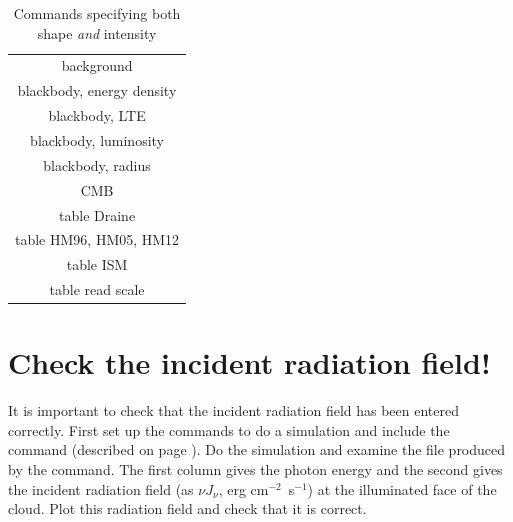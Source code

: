 \begin{center}
\begin{table}
\centering
\caption{\label{tab:ShapeIntensityCommands}
Commands specifying both shape \emph{and} intensity}
\label{table:3}
\begin{tabular}{c}
\hline
background\\
 blackbody, energy density\\
blackbody, LTE\\
blackbody,
luminosity\\
blackbody, radius\\
CMB\\
table Draine\\
table HM96, HM05, HM12\\
table ISM\\
table read scale\\
\hline
\end{tabular}
\end{table}
\end{center}

\section{Check the incident radiation field!}

It is important to check that the incident radiation field
has been entered correctly.
First set up the commands to do a simulation and include the  command
(described on page \pageref{sec:CommandSaveContinuum}).
Do the simulation and examine the
file produced by the  command.
The first column gives the
photon energy and the second gives the incident radiation field
(as $\nu J_{\nu}$, erg cm$^{-2}$~s$^{-1}$)
at the illuminated face of the cloud.
Plot this radiation field and check that it is correct.

